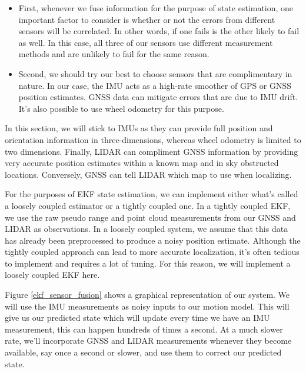 \begin{itemize}
\item First, whenever we fuse information for the purpose of state estimation, one important factor
to consider is whether or not the errors from different sensors will be correlated. In other words,
if one fails is the other likely to fail as well. In this case, all three of our sensors use different measurement
methods and are unlikely to fail for the same reason. 
\item Second, we should try our best to choose sensors that are complimentary in nature. In our case, the IMU acts as a high-rate
smoother of GPS or GNSS position estimates. GNSS data can mitigate errors that are due to IMU drift. It's also possible to use wheel odometry for this purpose. 
\end{itemize}

In this section, we will stick to IMUs as they can provide full position
and orientation information in three-dimensions, whereas wheel odometry is limited to two dimensions. Finally, LIDAR
can compliment GNSS information by providing very accurate position estimates within a known map and in sky obstructed locations. 
Conversely, GNSS can tell LIDAR which map to use when localizing. 




For the purposes of EKF state estimation, we can implement either what's called a loosely coupled estimator or a
tightly coupled one. In a tightly coupled EKF, we use the raw pseudo range and point cloud measurements from our GNSS and LIDAR
as observations. In a loosely coupled system, we assume that this data has already been preprocessed to produce a noisy
position estimate. Although the tightly coupled approach can lead to more accurate localization, it's often tedious
to implement and requires a lot of tuning. For this reason, we will implement a loosely coupled EKF here. 

Figure \ref{ekf_sensor_fusion} shows a graphical representation
of our system. We will use the IMU measurements as noisy inputs to
our motion model. This will give us our predicted state which will update every time we have an IMU measurement, this can happen hundreds
of times a second. At a much slower rate, we'll incorporate GNSS and LIDAR measurements whenever they become available, say once a second
or slower, and use them to correct our predicted state. 

